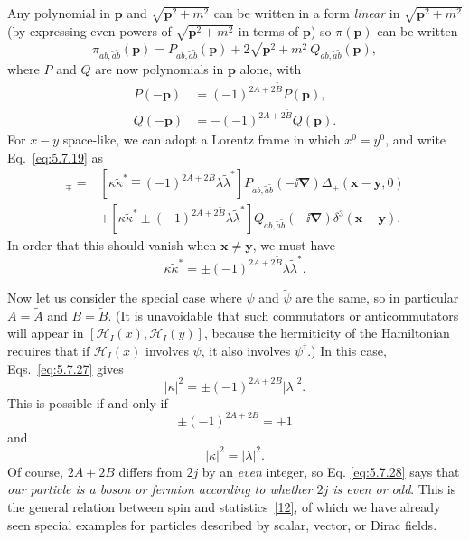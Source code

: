 Any polynomial in $\mathbf p$ and $\sqrt{\mathbf p^2+m^2}$ can be written in a
form \emph{linear} in $\sqrt{\mathbf p^2+m^2}$ (by expressing even powers of
$\sqrt{\mathbf p^2+m^2}$ in terms of $\mathbf p$) so $\pi(\mathbf p)$ can be
written
\begin{equation}
\pi_{ab,\tilde a\tilde b}(\mathbf p)=P_{ab,\tilde a\tilde b}(\mathbf p)
+2\sqrt{\mathbf p^2+m^2}\,Q_{ab,\tilde a\tilde b}(\mathbf p),
\tag{5.7.24}\label{eq:5.7.24}
\end{equation}
where $P$ and $Q$ are now polynomials in $\mathbf p$ alone, with
\begin{align}
P(-\mathbf p)&=(-1)^{2A+2\widetilde B}P(\mathbf p),
\tag{5.7.25}\label{eq:5.7.25}\\
Q(-\mathbf p)&=-(-1)^{2A+2\widetilde B}Q(\mathbf p).
\tag{5.7.26}\label{eq:5.7.26}
\end{align}
For $x-y$ space-like, we can adopt a Lorentz frame in which $x^0=y^0$, and
write Eq.~\eqref{eq:5.7.19} as
\begin{align*}
[\psi_{ab}(x),\widetilde\psi^\dagger_{\tilde a\tilde b}(y)]_\mp
={}&[\kappa\widetilde\kappa^*\mp
(-1)^{2A+2\widetilde B}\lambda\widetilde\lambda^*]
P_{ab,\tilde a\tilde b}(-\ii\boldsymbol\nabla)\Delta_+(\mathbf x-\mathbf y,0)
\\
&+[\kappa\widetilde\kappa^*\pm
(-1)^{2A+2\widetilde B}\lambda\widetilde\lambda^*]
Q_{ab,\tilde a\tilde b}(-\ii\boldsymbol\nabla)\delta^3(\mathbf x-\mathbf y).
\end{align*}
In order that this should vanish when $\mathbf x\neq\mathbf y$, we must have
\begin{equation}
\kappa\widetilde\kappa^*=\pm(-1)^{2A+2\widetilde B}
\lambda\widetilde\lambda^*.
\tag{5.7.27}\label{eq:5.7.27}
\end{equation}

Now let us consider the special case where $\psi$ and $\widetilde\psi$ are the
same, so in particular $A=\widetilde A$ and $B=\widetilde B$. (It is
unavoidable that such commutators or anticommutators will appear in
$[\mathcal H_I(x),\mathcal H_I(y)]$, because the hermiticity of the Hamiltonian
requires that if $\mathcal H_I(x)$ involves $\psi$, it also involves
$\psi^\dagger$.) In this case, Eqs.~\eqref{eq:5.7.27} gives
\[
|\kappa|^2=\pm(-1)^{2A+2B}|\lambda|^2.
\]
This is possible if and only if
\begin{equation}
\pm(-1)^{2A+2B}=+1
\tag{5.7.28}\label{eq:5.7.28}
\end{equation}
and
\begin{equation}
|\kappa|^2=|\lambda|^2.
\tag{5.7.29}\label{eq:5.7.29}
\end{equation}
Of course, $2A+2B$ differs from $2j$ by an \emph{even} integer, so Eq.
\eqref{eq:5.7.28} says that \emph{our particle is a boson or fermion according to
whether $2j$ is even or odd}. This is the general relation between spin and
statistics~\hyperref[ref:5.12]{[12]}, of which we have already seen special examples for particles
described by scalar, vector, or Dirac fields.

